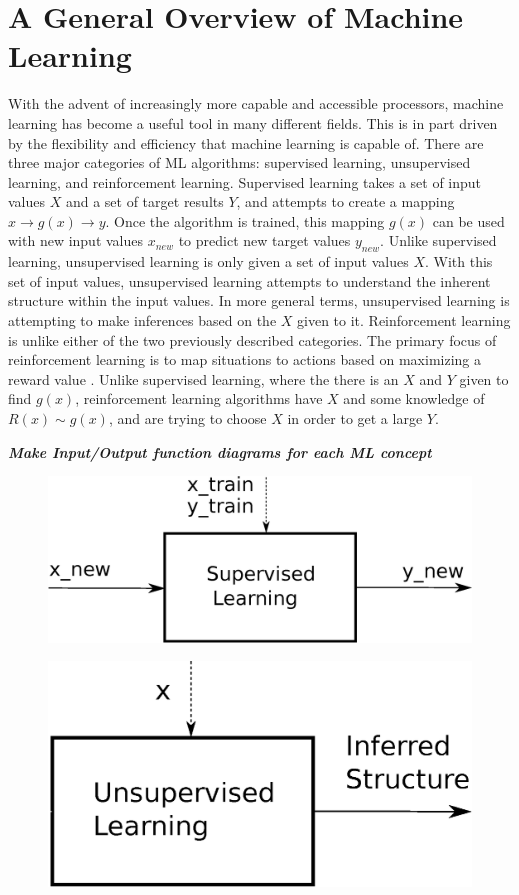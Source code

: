 \documentclass[11pt]{report}
\begin{document}
	\section{A General Overview of Machine Learning}
	\par With the advent of increasingly more capable and accessible processors, machine learning has become a useful tool in many different fields. This is in part driven by the flexibility and efficiency that machine learning is capable of. There are three major categories of ML algorithms\cite{IntroductionToML}: supervised learning, unsupervised learning, and reinforcement learning. Supervised learning takes a set of input values $X$ and a set of target results $Y$, and attempts to create a mapping $x \to g(x)\to y$. Once the algorithm is trained, this mapping $g(x)$ can be used with new input values $x_{new}$ to predict new target values $y_{new}$. Unlike supervised learning, unsupervised learning is only given a set of input values $X$. With this set of input values, unsupervised learning attempts to understand the inherent structure within the input values. In more general terms, unsupervised learning is attempting to make inferences based on the $X$ given to it. Reinforcement learning is unlike either of the two previously described categories. The primary focus of reinforcement learning is to map situations to actions based on maximizing a reward value \cite{rl_intro}. Unlike supervised learning, where the there is an $X$ and $Y$ given to find $g(x)$, reinforcement learning algorithms have $X$ and some knowledge of $R(x)\sim g(x)$, and are trying to choose $X$ in order to get a large $Y$. 
	\par \textbf{\textit{Make Input/Output function diagrams for each ML concept}} 
	\begin{figure}[ht]
		\centering
		\includegraphics[scale=0.4]{figures/supervisedLearningBlock.eps}
	\end{figure}
	\begin{figure}[ht]
		\centering
		\includegraphics[scale=0.4]{figures/unsupervisedLearningBlock.eps}
	\end{figure}
\end{document}
